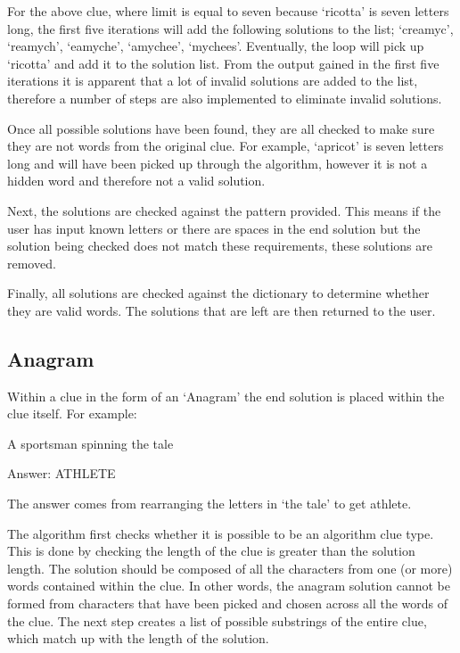 For the above clue, where limit is equal to seven because `ricotta' is seven
letters  long, the first five iterations will add the following solutions to the
list; `creamyc',  `reamych', `eamyche', `amychee', `mychees'. Eventually, the
loop will pick up  `ricotta' and add it to the solution list. From the output
gained in the first five  iterations it is apparent that a lot of invalid
solutions are added to the list, therefore a number of steps are also
implemented to eliminate invalid solutions.

Once all possible solutions have been found, they are all checked to make sure
they are not words from the original clue. For example, `apricot' is seven
letters long and will  have been picked up through the algorithm, however it is
not a hidden word and therefore  not a valid solution.

Next, the solutions are checked against the pattern provided. This means if the
user  has input known letters or there are spaces in the end solution but the
solution being  checked does not match these requirements, these solutions are
removed.

Finally, all solutions are checked against the dictionary to determine whether
they  are valid words. The solutions that are left are then returned to the
user.

\subsection{Anagram}

Within a clue in the form of an `Anagram' the end solution is placed within 
the clue itself. For example:

A sportsman spinning the tale

Answer: ATHLETE

The answer comes from rearranging the letters in `the tale' to get athlete.

The algorithm first checks whether it is possible to be an algorithm clue type. This 
is done by checking the length of the clue is greater than the solution length.
 The solution should be composed of all the characters from one (or more)
 words contained within the clue. In other words, the anagram solution
 cannot be formed from characters that have been picked and chosen across
 all the words of the clue. The next step creates a list of possible
 substrings of the entire clue, which match up with the length of the solution.

